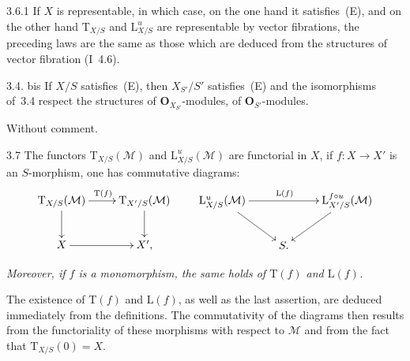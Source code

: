 \begin{remark}{3.6.1}
\label{II.3.6.1}
If \(X\) is representable, in which case, on the one hand it satisfies~(E),
and on the other hand \(\mathrm{T}_{X/S}\) and \(\mathrm{L}^{u}_{X/S}\) are
representable by vector fibrations, the preceding laws are the same as those
which are deduced from the structures of vector fibration
(\cf I~4.6).%
{\renewcommand{\thefootnote}{(25)}}
\end{remark}

\begin{proposition}{3.4. bis}
\label{II.3.4.bis}
If \(X/S\) satisfies~(E), then \(X_{S'}/S'\) satisfies~(E) and the
isomorphisms of~3.4 respect the structures of
\(\mathbf{O}_{X_{S'}}\)-modules, \resp of \(\mathbf{O}_{S'}\)-modules.
\end{proposition}

Without comment.

\begin{proposition}{3.7}
\label{II.3.7}
The functors \(\mathrm{T}_{X/S}(\mathcal{M})\) and
\(\mathrm{L}^{u}_{X/S}(\mathcal{M})\) are functorial in \(X\), \ie if
\(f\colon X\to X'\) is an \(S\)-morphism, one has commutative diagrams:
\[
\xymatrix{
  \mathrm{T}_{X/S}(\mathcal{M}) \ar[r]^{\mathrm{T}(f)} \ar[d]
    & \mathrm{T}_{X'/S}(\mathcal{M}) \ar[d] \\
  X \ar[r]
    & X',
}
\qquad
\xymatrix{
  \mathrm{L}^{u}_{X/S}(\mathcal{M}) \ar[rr]^{\mathrm{L}(f)} \ar[dr]
    & & \mathrm{L}^{f\circ u}_{X'/S}(\mathcal{M}) \ar[dl] \\
  & S. &
}
\]
\end{proposition}

{\renewcommand{\thefootnote}{(26)}}
\emph{Moreover, if \(f\) is a monomorphism, the same holds of
\(\mathrm{T}(f)\) and \(\mathrm{L}(f)\).}

The existence of \(\mathrm{T}(f)\) and \(\mathrm{L}(f)\), as well as the last
assertion, are deduced immediately from the definitions. The commutativity of
the diagrams then results from the functoriality of these morphisms with
respect to \(\mathcal{M}\) and from the fact that
\(\mathrm{T}_{X/S}(0)=X\).

